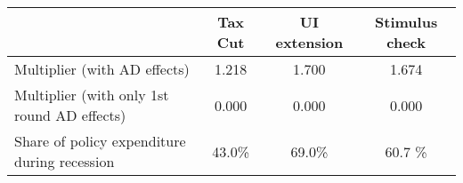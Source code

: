 \begin{tabular}{@{}lccc@{}} 
\toprule 
& Tax Cut    & UI extension    & Stimulus check    \\  \midrule 
Multiplier (with AD effects) &1.218  & 1.700  & 1.674     \\ 
Multiplier (with only 1st round AD effects) &0.000  & 0.000  & 0.000     \\ 
Share of policy expenditure during recession &43.0\%  & 69.0\%  & 60.7 \%    \\ 
\end{tabular}  
